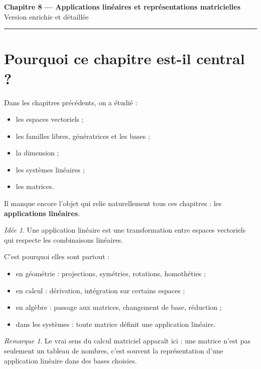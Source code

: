 \documentclass[11pt,a4paper]{article}
\theoremstyle{remark}
\newtheorem{remarque}[definition]{Remarque}
\newtheorem*{idee}{Idée}
\begin{document}
\begin{center}
    {\LARGE \textbf{Chapitre 8 --- Applications linéaires et représentations matricielles}}\\[0.4em]
    {\large Version enrichie et détaillée}
\end{center}

\hrule
\vspace{1em}

\tableofcontents

\newpage

\section{Pourquoi ce chapitre est-il central ?}

Dans les chapitres précédents, on a étudié :
\begin{itemize}
    \item les espaces vectoriels ;
    \item les familles libres, génératrices et les bases ;
    \item la dimension ;
    \item les systèmes linéaires ;
    \item les matrices.
\end{itemize}

Il manque encore l’objet qui relie naturellement tous ces chapitres : les \textbf{applications linéaires}.

\begin{idee}
Une application linéaire est une transformation entre espaces vectoriels qui respecte les combinaisons linéaires.
\end{idee}

C’est pourquoi elles sont partout :
\begin{itemize}
    \item en géométrie : projections, symétries, rotations, homothéties ;
    \item en calcul : dérivation, intégration sur certains espaces ;
    \item en algèbre : passage aux matrices, changement de base, réduction ;
    \item dans les systèmes : toute matrice définit une application linéaire.
\end{itemize}

\begin{remarque}
Le vrai sens du calcul matriciel apparaît ici : une matrice n’est pas seulement un tableau de nombres, c’est souvent la représentation d’une application linéaire dans des bases choisies.
\end{remarque}
\end{document}
